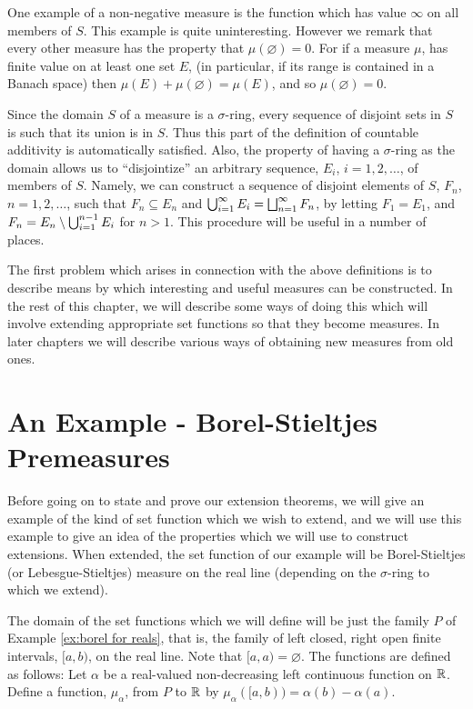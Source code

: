 One example of a non-negative measure is the function which has value $\infty$ on all members of $S$. This example is quite uninteresting. However we remark that every other measure has the property that $\mu(\varnothing)=0$. For if a measure $\mu$, has finite value on at least one set $E$, (in particular, if its range is contained in a Banach space) then $\mu(E)+\mu(\varnothing)=\mu(E)$, and so $\mu(\varnothing)=0$.

Since the domain $S$ of a measure is a $\sigma$-ring, every sequence of disjoint sets in $S$ is such that its union is in $S$. Thus this part of the definition of countable additivity is automatically satisfied. Also, the property of having a $\sigma$-ring as the domain allows us to ``disjointize'' an arbitrary sequence, $E_i$, $i = 1, 2,\dots$, of members of $S$. Namely, we can construct a sequence of disjoint elements of $S$, $F_n$, $n = 1, 2,\dots$, such that $F_n\subseteq E_n$ and $\bigcup_{i=1}^\infty E_i=\bigsqcup_{n=1}^\infty F_n$, by letting $F_1 = E_1$, and $F_n=E_n\setminus\bigcup_{i=1}^{n-1}E_i$ for $n > 1$. This procedure will be useful in a number of places.

The first problem which arises in connection with the above definitions is to describe means by which interesting and useful measures can be constructed. In the rest of this chapter, we will describe some ways of doing this which will involve extending appropriate set functions so that they become measures. In later chapters we will describe various ways of obtaining new measures from old ones.


\section{An Example - Borel-Stieltjes Premeasures}

Before going on to state and prove our extension theorems, we will give an example of the kind of set function which we wish to extend, and we will use this example to give an idea of the properties which we will use to construct extensions. When extended, the set function of our example will be Borel-Stieltjes (or Lebesgue-Stieltjes) measure on the real line (depending on the $\sigma$-ring to which we extend).

\begin{definition}\label{def:stieltjes premeasure}
The domain of the set functions which we will define will be just the family $P$ of Example \ref{ex:borel for reals}, that is, the family of left closed, right open finite intervals, $[a, b)$, on the real line. Note that $[a, a)=\varnothing $. The functions are defined as follows: Let $\alpha$ be a real-valued non-decreasing left continuous function on $\mathbb{R}$. Define a function, $\mu_\alpha$, from $P$ to $\mathbb{R}$ by $\mu_\alpha([a, b))=\alpha(b)-\alpha(a)$.
\end{definition}

